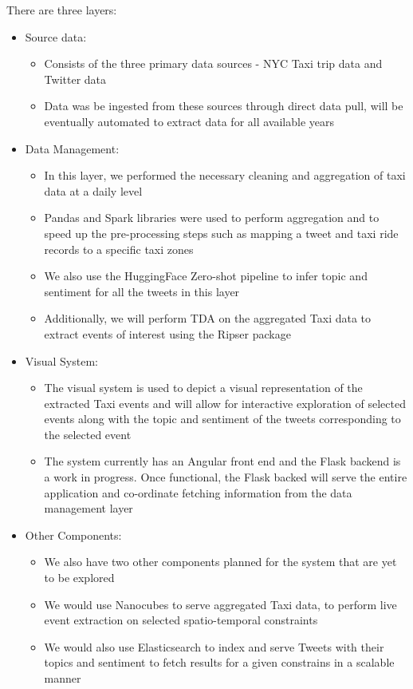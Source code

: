 There are three layers:
\begin{itemize}
    \item Source data:
        \begin{itemize}
            \item Consists of the three primary data sources - NYC Taxi trip data and Twitter data
            \item Data was be ingested from these sources through direct data pull, will be eventually automated to extract data for all available years
        \end{itemize}
        
    \item Data Management:
        \begin{itemize}
            \item In this layer, we performed the necessary cleaning and aggregation of taxi data at a daily level
            \item Pandas and Spark libraries were used to perform aggregation and to speed up the pre-processing steps such as mapping a tweet and taxi ride records to a specific taxi zones
            \item We also use the HuggingFace Zero-shot pipeline to infer topic and sentiment for all the tweets in this layer
            \item Additionally, we will perform TDA on the aggregated Taxi data to extract events of interest using the Ripser package
        \end{itemize}
    \item Visual System:
        \begin{itemize}
            \item The visual system is used to depict a visual representation of the extracted Taxi events and will allow for interactive exploration of selected events along with the topic and sentiment of the tweets corresponding to the selected event
            \item The system currently has an Angular front end and the Flask backend is a work in progress. Once functional, the Flask backed will serve the entire application and co-ordinate fetching information from the data management layer
        \end{itemize}
    \item Other Components:
        \begin{itemize}
            \item We also have two other components planned for the system that are yet to be explored
            \item We would use Nanocubes to serve aggregated Taxi data, to perform live event extraction on selected spatio-temporal constraints
            \item We would also use Elasticsearch to index and serve Tweets with their topics and sentiment to fetch results for a given constrains in a scalable manner
        \end{itemize}
\end{itemize}




